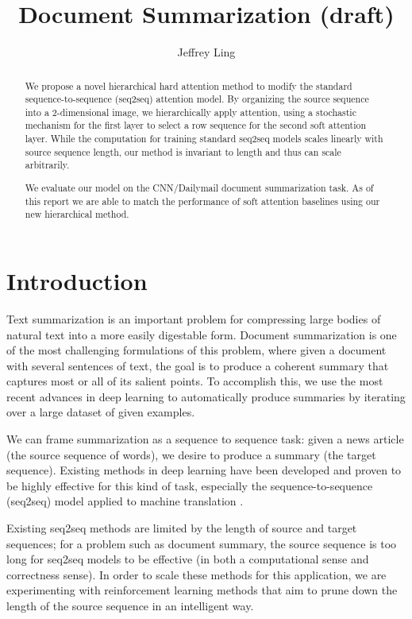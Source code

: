 \documentclass[11pt]{article}
\title{Document Summarization (draft)}
\author{Jeffrey Ling}
\begin{document}
\maketitle{}


\begin{abstract}
We propose a novel hierarchical hard attention method to modify the standard sequence-to-sequence (seq2seq) attention model. By organizing the source sequence into a 2-dimensional image, we hierarchically apply attention, using a stochastic mechanism for the first layer to select a row sequence for the second soft attention layer. While the computation for training standard seq2seq models scales linearly with source sequence length, our method is invariant to length and thus can scale arbitrarily.

We evaluate our model on the CNN/Dailymail document summarization task. As of this report we are able to match the performance of soft attention baselines using our new hierarchical method.
\end{abstract}

\section{Introduction}


Text summarization is an important problem for compressing large bodies of natural text into a more easily digestable form. Document summarization is one of the most challenging formulations of this problem, where given a document with several sentences of text, the goal is to produce a coherent summary that captures most or all of its salient points. To accomplish this, we use the most recent advances in deep learning to automatically produce summaries by iterating over a large dataset of given examples.

We can frame summarization as a sequence to sequence task: given a news article (the source sequence of words), we desire to produce a summary (the target sequence). Existing methods in deep learning have been developed and proven to be highly effective for this kind of task, especially the sequence-to-sequence (seq2seq) model applied to machine translation \citep{sutskever2014sequence, bahdanau2014neural}.

Existing seq2seq methods are limited by the length of source and target sequences; for a problem such as document summary, the source sequence is too long for seq2seq models to be effective (in both a computational sense and correctness sense). In order to scale these methods for this application, we are experimenting with reinforcement learning methods that aim to prune down the length of the source sequence in an intelligent way.
\end{document}
